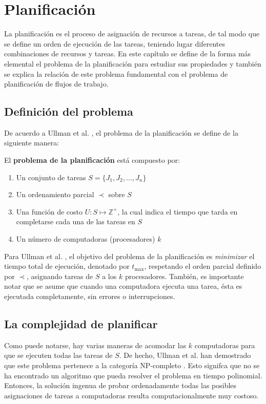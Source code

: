 \chapter{Planificación}
La planificación
es el proceso de asignación de recursos a tareas, de tal modo que se define un orden de ejecución de las tareas, teniendo lugar diferentes combinaciones de recursos y tareas. En este capítulo se define de la forma más elemental el problema de la planificación para estudiar sus propiedades y también se explica la relación de este problema fundamental con el problema de planificación de flujos de trabajo.


\section{Definición del problema}
\label{secc:scheduling_problem}
De acuerdo a  Ullman et al. \cite{ullman1975np}, el problema de la planificación se define de la siguiente manera: 

\begin{defn}
El \textbf{problema de la planificación} está compuesto por:
\begin{enumerate}
\item Un conjunto de tareas $S = \{ J_1, J_2, \dots, J_n \}$
\item Un ordenamiento parcial $\prec$ sobre $S$
\item Una función de costo $U: S \mapsto \mathbb{Z}^{+}$, la cual indica el tiempo que tarda en completarse cada una de las tareas en $S$
\item Un número de computadoras (procesadores) $k$
\end{enumerate}
\end{defn}

Para Ullman et al. \cite{ullman1975np}, el objetivo del problema de la planificación es \emph{minimizar} el tiempo total de ejecución, denotado por $t_\text{max}$, respetando el orden parcial definido por $\prec$, asignando tareas de $S$ a los $k$ procesadores.
También, es importante notar que se asume que cuando una computadora ejecuta una tarea, ésta es ejecutada completamente, sin errores o interrupciones.

\section{La complejidad de planificar}
Como puede notarse, hay varias maneras de acomodar las $k$ computadoras para que se ejecuten todas las tareas de $S$. De hecho, Ullman et al. han demostrado que este problema pertenece a la categoría NP-completo \cite{ullman1975np}. Esto signifca que no se ha encontrado un algoritmo que pueda resolver el problema en tiempo polinomial. Entonces, la solución ingenua de probar ordenadamente todas las posibles asignaciones de tareas a computadoras resulta computacionalmente muy costoso.

